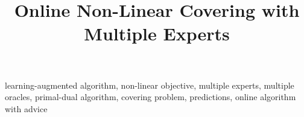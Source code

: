 \documentclass[anon,12pt]{alt2025} %
\title[Online Non-Linear Covering with Multiple Experts]{Online Non-Linear Covering with Multiple Experts}
\begin{document}
\maketitle



\begin{keywords}
    learning-augmented algorithm, non-linear objective, multiple experts, multiple oracles, primal-dual algorithm, covering problem, predictions, online algorithm with advice
\end{keywords}







\clearpage



\clearpage

\appendix
%




\clearpage

\end{document}
